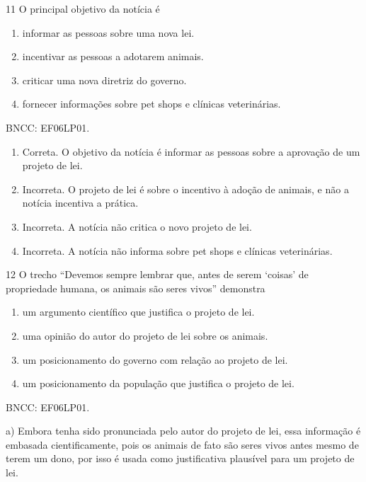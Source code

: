 
\num{11} O principal objetivo da notícia é

\begin{enumerate}
\def\labelenumi{\alph{enumi})}
\item
  informar as pessoas sobre uma nova lei.
\item
  incentivar as pessoas a adotarem animais.
\item
  criticar uma nova diretriz do governo.
\item
  fornecer informações sobre pet shops e clínicas veterinárias.
\end{enumerate}

BNCC: EF06LP01.

\begin{enumerate}
\def\labelenumi{\alph{enumi})}
\item
  Correta. O objetivo da notícia é informar as pessoas sobre a aprovação
  de um projeto de lei.
\item
  Incorreta. O projeto de lei é sobre o incentivo à adoção de animais, e
  não a notícia incentiva a prática.
\item
  Incorreta. A notícia não critica o novo projeto de lei.
\item
  Incorreta. A notícia não informa sobre pet shops e clínicas
  veterinárias.
\end{enumerate}

\num{12} O trecho ``Devemos sempre lembrar que, antes de serem `coisas'
de propriedade humana, os animais são seres vivos'' demonstra

\begin{enumerate}
\def\labelenumi{\alph{enumi})}
\item
  um argumento científico que justifica o projeto de lei.
\item
  uma opinião do autor do projeto de lei sobre os animais.
\item
  um posicionamento do governo com relação ao projeto de lei.
\item
  um posicionamento da população que justifica o projeto de lei.
\end{enumerate}

BNCC: EF06LP01.

a) Embora tenha sido pronunciada pelo autor do projeto de lei, essa
informação é embasada cientificamente, pois os animais de fato são seres
vivos antes mesmo de terem um dono, por isso é usada como justificativa
plausível para um projeto de lei.

